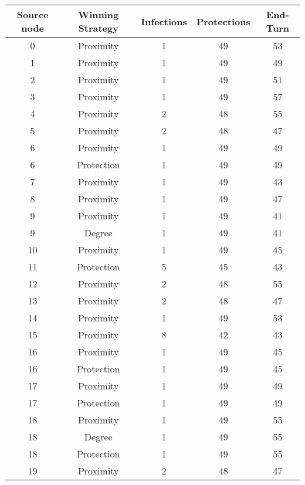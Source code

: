 \documentclass[results.tex]{subfiles}
\begin{document}
\begin{center}
  \begin{tabular}{| c || c | c | c | c |}
    \hline
    {\bfseries Source node} & {\bfseries Winning Strategy} & {\bfseries Infections} & {\bfseries Protections} & {\bfseries End-Turn} \\  %
    \hline\hline
    0 & Proximity & 1 & 49 & 53 \\ 
    \hline
    1 & Proximity & 1 & 49 & 49 \\ 
    \hline
    2 & Proximity & 1 & 49 & 51 \\ 
    \hline
    3 & Proximity & 1 & 49 & 57 \\ 
    \hline
    4 & Proximity & 2 & 48 & 55 \\ 
    \hline
    5 & Proximity & 2 & 48 & 47 \\ 
    \hline
    6 & Proximity & 1 & 49 & 49 \\ 
    \hline
    6 & Protection & 1 & 49 & 49 \\ 
    \hline
    7 & Proximity & 1 & 49 & 43 \\ 
    \hline
    8 & Proximity & 1 & 49 & 47 \\ 
    \hline
    9 & Proximity & 1 & 49 & 41 \\ 
    \hline
    9 & Degree & 1 & 49 & 41 \\ 
    \hline
    10 & Proximity & 1 & 49 & 45 \\ 
    \hline
    11 & Protection & 5 & 45 & 43 \\ 
    \hline
    12 & Proximity & 2 & 48 & 55 \\ 
    \hline
    13 & Proximity & 2 & 48 & 47 \\ 
    \hline
    14 & Proximity & 1 & 49 & 53 \\ 
    \hline
    15 & Proximity & 8 & 42 & 43 \\ 
    \hline
    16 & Proximity & 1 & 49 & 45 \\ 
    \hline
    16 & Protection & 1 & 49 & 45 \\ 
    \hline
    17 & Proximity & 1 & 49 & 49 \\ 
    \hline
    17 & Protection & 1 & 49 & 49 \\ 
    \hline
    18 & Proximity & 1 & 49 & 55 \\ 
    \hline
    18 & Degree & 1 & 49 & 55 \\ 
    \hline
    18 & Protection & 1 & 49 & 55 \\ 
    \hline
    19 & Proximity & 2 & 48 & 47 \\ 

\end{tabular}
\end{center}
\end{document}
